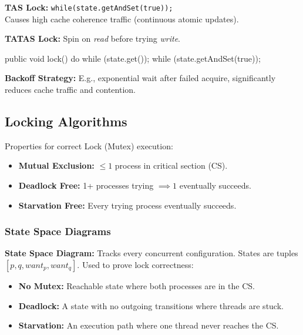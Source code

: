\textbf{TAS Lock:} \texttt{while(state.getAndSet(true));} \\
Causes high cache coherence traffic (continuous atomic updates).

\textbf{TATAS Lock:} Spin on \textit{read} before trying \textit{write}.
\begin{codeexample}
public void lock() {
    do { while (state.get()); } 
    while (state.getAndSet(true));
}
\end{codeexample}

\begin{remark}
    \textbf{Backoff Strategy:} E.g., exponential wait after failed acquire, significantly reduces cache traffic and contention.
\end{remark}

\subsection{Locking Algorithms}

Properties for correct Lock (Mutex) execution:
\begin{itemize}
    \item \textbf{Mutual Exclusion:} $\le 1$ process in critical section (CS).
    \item \textbf{Deadlock Free:} 1+ processes trying $\implies 1$ eventually succeeds.
    \item \textbf{Starvation Free:} Every trying process eventually succeeds.
\end{itemize}

\subsubsection{State Space Diagrams}

\begin{definition}
    \textbf{State Space Diagram:} Tracks every concurrent configuration. States are tuples $[p, q, want_p, want_q]$. Used to prove lock correctness:
    \begin{itemize}
        \item \textbf{No Mutex:} Reachable state where both processes are in the CS.
        \item \textbf{Deadlock:} A state with no outgoing transitions where threads are stuck.
        \item \textbf{Starvation:} An execution path where one thread never reaches the CS.
    \end{itemize}
\end{definition}

